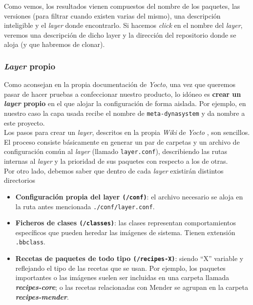 Como vemos, los resultados vienen compuestos del nombre de los paquetes, las versiones (para filtrar cuando existen varias del mismo), una descripción inteligible y el \textit{layer} donde encontrarlo. Si hacemos \textit{click} en el nombre del \textit{layer}, veremos una descripción de dicho layer y la dirección del repositorio donde se aloja (y que habremos de clonar).\\

\subsubsection{\textit{Layer} propio}

Como aconsejan en la propia documentación de \textit{Yocto}, una vez que queremos pasar de hacer pruebas a confeccionar nuestro producto, lo idóneo es \textbf{crear un \textit{layer} propio} en el que alojar la configuración de forma aislada. Por ejemplo, en nuestro caso la capa usada recibe el nombre de \texttt{meta-dynasystem} y da nombre a este proyecto.\\

Los pasos para crear un \textit{layer}, descritos en la propia \textit{Wiki} de \textit{Yocto} \cite{wiki-yocto-own-layer}, son sencillos. El proceso consiste básicamente en generar un par de carpetas y un archivo de configuración común al \textit{layer} (llamado \texttt{layer.conf}), describiendo las rutas internas al \textit{layer} y la prioridad de sus paquetes con respecto a los de otras.\\

Por otro lado, debemos saber que dentro de cada \textit{layer} existirán distintos directorios 

\begin{itemize}
	\item \textbf{Configuración propia del layer \texttt{(/conf)}}: el archivo necesario se aloja en la ruta antes mencionada \texttt{./conf/layer.conf}.
	\item \textbf{Ficheros de clases \texttt{(/classes)}}: las clases representan comportamientos específicos que pueden heredar las imágenes de sistema. Tienen extensión \texttt{.bbclass}.
	\item \textbf{Recetas de paquetes de todo tipo \texttt{(/recipes-X)}}: siendo ``X'' variable y reflejando el tipo de las recetas que se usan. Por ejemplo, los paquetes importantes o las imágenes suelen ser incluidas en una carpeta llamada \textbf{\textit{recipes-core}}; o las recetas relacionadas con Mender se agrupan en la carpeta \textbf{\textit{recipes-mender}}.
\end{itemize}

